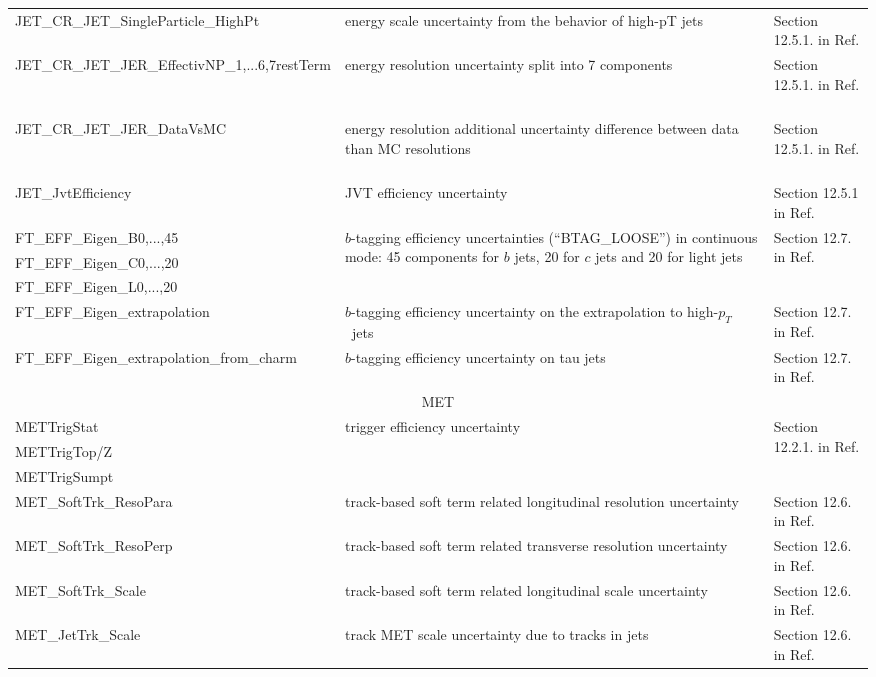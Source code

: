 \begin{table}
{\begin{tabular}{l|ll}
JET\_CR\_JET\_SingleParticle\_HighPt & energy scale uncertainty from the behavior of high-pT jets & Section 12.5.1. in Ref. \cite{VHobjectsupportnote}\\
JET\_CR\_JET\_JER\_EffectivNP\_1,...6,7restTerm & energy resolution uncertainty split into 7 components &  Section 12.5.1. in Ref. \cite{VHobjectsupportnote}\ \\
JET\_CR\_JET\_JER\_DataVsMC & energy resolution additional uncertainty difference between data than MC resolutions &  Section 12.5.1. in Ref. \cite{VHobjectsupportnote}\ \\
JET\_JvtEfficiency & JVT efficiency uncertainty & Section 12.5.1 in Ref. \cite{VHobjectsupportnote}\ \\
FT\_EFF\_Eigen\_B0,...,45 & \multirow{3}{*}{\parbox{11cm}{$b$-tagging efficiency uncertainties (``BTAG\_LOOSE'') in continuous mode: 45 components for $b$ jets, 20 for $c$ jets and 20 for light jets}} & \multirow{3}{*}{ Section 12.7. in Ref. \cite{VHobjectsupportnote}}\\
FT\_EFF\_Eigen\_C0,...,20   &&\\
FT\_EFF\_Eigen\_L0,...,20 &&\\
FT\_EFF\_Eigen\_extrapolation & $b$-tagging efficiency uncertainty on the extrapolation to high-$p_T$\ jets& Section 12.7. in  Ref. \cite{VHobjectsupportnote}\\
FT\_EFF\_Eigen\_extrapolation\_from\_charm & $b$-tagging efficiency uncertainty on tau jets & Section 12.7. in  Ref. \cite{VHobjectsupportnote}\\\hline
\multicolumn{3}{c}{MET}\\\hline
METTrigStat  &  \multirow{2}{*}{trigger efficiency uncertainty} & \multirow{2}{*}{Section 12.2.1. in  Ref. \cite{VHobjectsupportnote}}\\
METTrigTop/Z & &\\       
METTrigSumpt & &\\       
MET\_SoftTrk\_ResoPara& track-based soft term related longitudinal resolution uncertainty & Section 12.6. in  Ref. \cite{VHobjectsupportnote} \\
MET\_SoftTrk\_ResoPerp&  track-based soft term related transverse resolution uncertainty & Section 12.6. in  Ref. \cite{VHobjectsupportnote} \\
MET\_SoftTrk\_Scale   &track-based soft term related longitudinal scale uncertainty & Section 12.6. in Ref. \cite{VHobjectsupportnote} \\  
MET\_JetTrk\_Scale    & track MET scale uncertainty due to tracks in jets &Section 12.6. in  Ref. \cite{VHobjectsupportnote}\\\hline

\end{tabular}}
\end{table}

